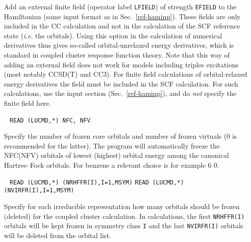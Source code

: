 \begin{description}
    Add an external finite field (operator label \verb+LFIELD+)
    of strength \verb+EFIELD+ to the Hamiltonian
    (same input format as in Sec.~\ref{ref-haminp}).
    These fields are only included in the CC calculation and 
    not in the calculation of the SCF reference state 
    ({\it i.e.\/} the orbitals). 
    Using this option in the calculation of numerical derivatives 
    thus gives so-called orbital-unrelaxed energy derivatives, 
    which is standard in coupled cluster response function theory.
    Note that this way of adding an external field does not work for 
    models including triples excitations (most notably CCSD(T) and CC3).
    For finite field calculations of orbital-relaxed energy 
    derivatives the field must be included in the SCF calculation.
    For such calculations, use the input section  (Sec.~\ref{ref-haminp}),
    and do \emph{not} specify the finite field here.
 
\item[\Key{FREEZE}] \verb| |\newline
      \verb|READ (LUCMD,*) NFC, NFV|

     Specify the number of frozen core orbitals and number of frozen virtuals (0 is recommended for the latter).
     The program will automatically freeze the NFC(NFV) orbitals of lowest (highest) orbital energy
     among the canonical Hartree--Fock orbitals.
     For benzene a relevant choice is for example 6 0.

\item[\Key{FROIMP}] \verb| |\newline
      \verb|READ (LUCMD,*) (NRHFFR(I),I=1,MSYM)|\newline
      \verb|READ (LUCMD,*) (NVIRFR(I),I=1,MSYM)|

      Specify for each irreducible representation how
      many orbitals should be frozen (deleted) for the coupled
      cluster calculation. In calculations, the first \verb+NRHFFR(I)+
      orbitals will be kept frozen in symmetry class \verb+I+ and
      the last \verb+NVIRFR(I)+ orbitals will be deleted from the 
      orbital list.
 

\end{description}

